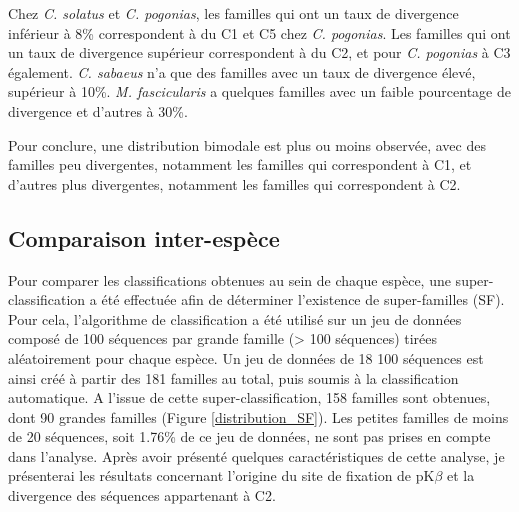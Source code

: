 \documentclass[12pt,a4paper]{article}
\begin{document}
	Chez \textit{C. solatus} et \textit{C. pogonias}, les familles qui ont un taux de divergence inférieur à 8\% correspondent à du C1 et C5 chez \textit{C. pogonias}. Les familles qui ont un taux de divergence supérieur correspondent à du C2, et pour \textit{C. pogonias} à C3 également. \textit{C. sabaeus} n'a que des familles avec un taux de divergence élevé, supérieur à 10\%. \textit{M. fascicularis} a quelques familles avec un faible pourcentage de divergence et d'autres à 30\%. 
	
	Pour conclure, une distribution bimodale est plus ou moins observée, avec des familles peu divergentes, notamment les familles qui correspondent à C1, et d'autres plus divergentes, notamment les familles qui correspondent à C2.
	
	\subsection{Comparaison inter-espèce}
	Pour comparer les classifications obtenues au sein de chaque espèce, une super-classification a été effectuée afin de déterminer l'existence de super-familles (SF). Pour cela, l'algorithme de classification a été utilisé sur un jeu de données composé de 100 séquences par grande famille (> 100 séquences) tirées aléatoirement pour chaque espèce. Un jeu de données de 18 100 séquences est ainsi créé à partir des 181 familles au total, puis soumis à la classification automatique. A l'issue de cette super-classification, 158 familles sont obtenues, dont 90 grandes familles (Figure \ref{distribution_SF}). Les petites familles de moins de 20 séquences, soit 1.76\% de ce jeu de données, ne sont pas prises en compte dans l'analyse. Après avoir présenté quelques caractéristiques de cette analyse, je présenterai les résultats concernant l'origine du site de fixation de pK$\beta$ et la divergence des séquences appartenant à C2.
	
\end{document}
